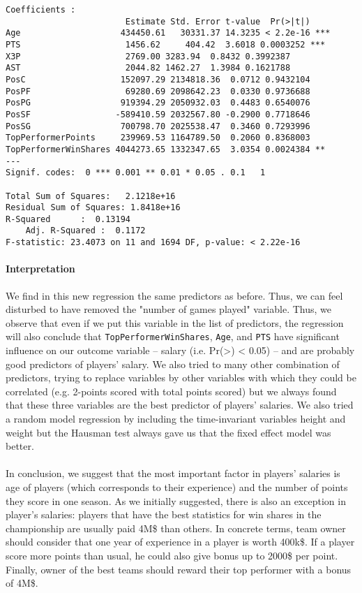 \begin{verbatim}
Coefficients :
                        Estimate Std. Error t-value  Pr(>|t|)	
Age                    434450.61   30331.37 14.3235 < 2.2e-16 ***
PTS                  	1456.62 	404.42  3.6018 0.0003252 ***
X3P                  	2769.00	3283.94  0.8432 0.3992387	
AST                  	2044.82	1462.27  1.3984 0.1621788	
PosC                   152097.29 2134818.36  0.0712 0.9432104	
PosPF                   69280.69 2098642.23  0.0330 0.9736688	
PosPG                  919394.29 2050932.03  0.4483 0.6540076	
PosSF                 -589410.59 2032567.80 -0.2900 0.7718646	
PosSG                  700798.70 2025538.47  0.3460 0.7293996	
TopPerformerPoints     239969.53 1164789.50  0.2060 0.8368003	
TopPerformerWinShares 4044273.65 1332347.65  3.0354 0.0024384 **
---
Signif. codes:  0 *** 0.001 ** 0.01 * 0.05 . 0.1   1
 
Total Sum of Squares:	2.1218e+16
Residual Sum of Squares: 1.8418e+16
R-Squared      :  0.13194
  	Adj. R-Squared :  0.1172
F-statistic: 23.4073 on 11 and 1694 DF, p-value: < 2.22e-16
\end{verbatim}

\paragraph{Interpretation}We find in this new regression the same predictors as before. Thus, we can feel disturbed to have removed the "number of games played" variable. Thus, we observe that even if we put this variable in the list of predictors, the regression will also conclude that \texttt{TopPerformerWinShares}, \texttt{Age}, and \texttt{PTS} have significant influence on our outcome variable – salary (i.e. Pr(>\textbart\textbar) < 0.05) – and are probably good predictors of players' salary. We also tried to many other combination of predictors, trying to replace variables by other variables with which they could be correlated (e.g. 2-points scored with total points scored) but we always found that these three variables are the best predictor of players' salaries.
We also tried a random model regression by including the time-invariant variables height and weight but the Hausman test always gave us that the fixed effect model was better.

\paragraph{}In conclusion, we suggest that the most important factor in players' salaries is age of players (which corresponds to their experience) and the number of points they score in one season. As we initially suggested, there is also an exception in player's salaries: players that have the best statistics for win shares in the championship are usually paid 4M\$ than others. In concrete terms, team owner should consider that one year of experience in a player is worth 400k\$. If a player score more points than usual, he could also give bonus up to 2000\$ per point. Finally, owner of the best teams should reward their top performer with a bonus of 4M\$.
